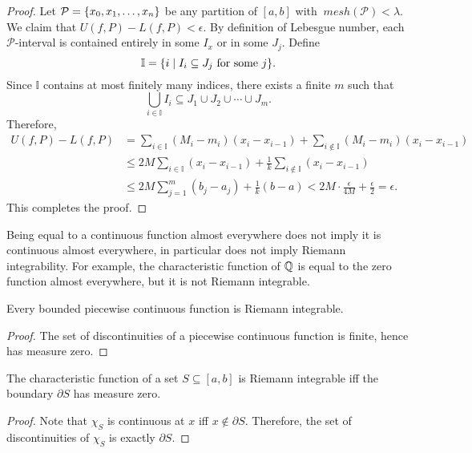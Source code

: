 \begin{thm}
\begin{proof}
        Let $\mathcal P = {\left\{{x_0, x_1, \ldots, x_n}\right\}}$ be any partition of $[a, b]$ with $~mesh(\mathcal P) < \lambda$. We claim that $U(f, P) - L(f, P) < \epsilon$. By definition of Lebesgue number, each $\mathcal P$-interval is contained entirely in some $I_x$ or in some $J_j$. Define
        \[
        \mathbb I = {\left\{{i \mid I_i \subseteq J_j \text{ for some } j}\right\}}.
        \]
        Since $\mathbb I$ contains at most finitely many indices, there exists a finite $m$ such that
        \[
        \bigcup_{i \in \mathbb I} I_i \subseteq J_1 \cup J_2 \cup \cdots \cup J_m.
        \]
        Therefore,
        \begin{align*}
            U(f, P) - L(f, P) &= \sum_{i \in \mathbb I} (M_i - m_i)(x_i - x_{i-1}) + \sum_{i \notin \mathbb I} (M_i - m_i)(x_i - x_{i-1}) \\
            &\leq 2M \sum_{i \in \mathbb I} (x_i - x_{i-1}) + \frac1k \sum_{i \notin \mathbb I} (x_i - x_{i-1}) \\
            &\leq 2M \sum_{j=1}^m (b_j - a_j) + \frac1k (b - a) < 2M \cdot \frac{\epsilon}{4M} + \frac{\epsilon}{2} = \epsilon.
        \end{align*}
        This completes the proof.
    \end{proof}
\end{thm}

\begin{rmk}
    Being equal to a continuous function almost everywhere does not imply it is continuous almost everywhere, in particular does not imply Riemann integrability. For example, the characteristic function of ${\mathbb Q}$ is equal to the zero function almost everywhere, but it is not Riemann integrable.
\end{rmk}

\begin{cl}
    Every bounded piecewise continuous function is Riemann integrable.
    \begin{proof}
        The set of discontinuities of a piecewise continuous function is finite, hence has measure zero. 
    \end{proof}
\end{cl}

\begin{cl}
    The characteristic function of a set $S \subseteq [a, b]$ is Riemann integrable iff the boundary $\partial S$ has measure zero.
    \begin{proof}
        Note that $\chi_S$ is continuous at $x$ iff $x \notin \partial S$. Therefore, the set of discontinuities of $\chi_S$ is exactly $\partial S$. 
    \end{proof}
\end{cl}

